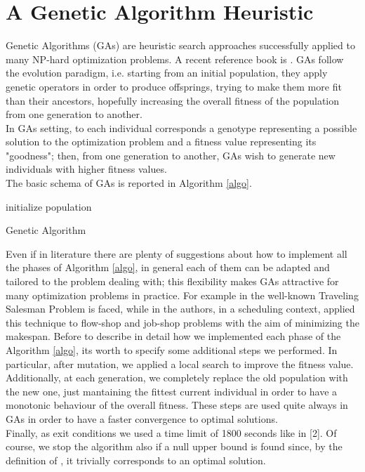 \documentclass[opre,nonblindrev]{informs3} %
\begin{document}
\section{A Genetic Algorithm Heuristic}
Genetic Algorithms (GAs) are heuristic search approaches successfully applied to many NP-hard optimization problems. A recent reference book is \cite{kramer}. GAs follow the evolution paradigm, i.e. starting from an initial population, they apply genetic operators in order to produce offsprings, trying to make them more fit than their ancestors, hopefully increasing the overall fitness of the population from one generation to another.\\
In GAs setting, to each individual corresponds a genotype representing a possible solution to the optimization problem and a fitness value representing its "goodness"; then, from one generation to another, GAs wish to generate new individuals with higher fitness values.\\
The	basic schema of GAs is reported in Algorithm \ref{algo}.\\
\begin{algorithm} \label{algo}
	\SetAlgoLined
	initialize population\\
	\caption{Genetic Algorithm}
\end{algorithm}
\noindent Even if in literature there are plenty of suggestions about how to implement all the phases of Algorithm \ref{algo}, in general each of them can be adapted and tailored to the problem dealing with; this flexibility makes GAs attractive for many optimization problems in practice. For example in \cite{tsp1,tsp2,tsp3} the well-known Traveling Salesman Problem is faced, while in \cite{sched1,sched3} the authors, in a scheduling context, applied this technique to flow-shop and job-shop problems with the aim of minimizing the makespan.
Before to describe in detail how we implemented each phase of the Algorithm \ref{algo}, its worth to specify some additional steps we performed. In particular, after mutation, we applied a local search to improve the fitness value. Additionally, at each generation, we completely replace the old population with the new one, just mantaining the fittest current individual in order to have a monotonic behaviour of the overall fitness. These steps are used quite always in GAs in order to have a faster convergence to optimal solutions.\\
Finally, as exit conditions we used a time limit of 1800 seconds like in [2]. Of course, we stop the algorithm also if a null upper bound is found since, by the definition of , it trivially corresponds to an optimal solution. 
\end{document}

